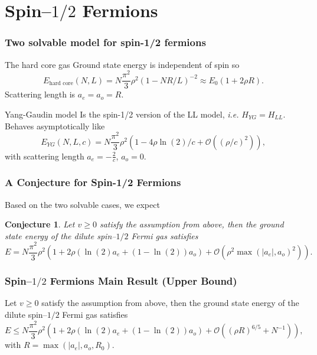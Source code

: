 \documentclass{beamer}[10]
\newcommand{\abs}[1]{\left\lvert #1 \right\rvert}
\newcommand{\ie}{\emph{i.e.} }
\newtheorem{mconjecture}{Conjecture}
\begin{document}
\section{Spin--$1/2$ Fermions}
\begin{frame}
	\frametitle{Two solvable model for spin-1/2 fermions}
	\vspace*{-0.4cm}
	\begin{block}{The hard core gas}
		Ground state energy is independent of spin
		so \begin{equation}
		E_{\text{hard core}}(N,L)=N\frac{\pi^2}{3}\rho^2 (1-NR/L)^{-2}\approx E_0(1+2\rho R).
		\end{equation}
		Scattering length is $ a_e=a_o=R $.
	\end{block}
	\begin{block}{Yang-Gaudin model}
		Is the spin-1/2 version of the LL model, \ie $ H_{YG}=H_{LL} $.
		 Behaves asymptotically like
		 \begin{equation}
		 E_{YG}(N,L,c)=N\frac{\pi^2}{3}\rho^2\left(1-4\rho\ln(2)/c+\mathcal{O}\left((\rho/c)^2\right)\right),
		 \end{equation}
		 with scattering length $ a_e=-\frac{2}{c} $, $ a_o=0 $.
		\end{block}
\end{frame}

\begin{frame}
	\frametitle{A Conjecture for Spin-1/2 Fermions}
	\small
	Based on the two solvable cases, we expect
	\begin{mconjecture}\label{ConjectureEqCSpin1/2FermiGroundStateEnergy}
		Let $ v\geq0 $ satisfy the assumption from above, then the ground state energy of the dilute spin--$ 1/2 $ Fermi gas satisfies\begin{equation}\label{EqConjectureEqCSpin1/2FermiGroundStateEnergy}
			E=N\frac{\pi^2}{3}\rho^2\left(1+2\rho \left(\ln(2) a_e+(1-\ln(2))a_o\right)+\mathcal{O}(\rho^2\max(\abs{a_e},a_o)^2)\right).
		\end{equation}
	\end{mconjecture}
\end{frame}

\begin{frame}
	\frametitle{Spin--$1/2$ Fermions Main Result (Upper Bound)}
	\begin{block}{}
		\small
		\begin{theorem}\label{TheoremUpperBoundSpin1/2Fermi}
			Let $ v\geq0 $ satisfy the assumption from above, then the ground state energy of the dilute spin--$ 1/2 $ Fermi gas satisfies\begin{equation}\label{EqUpperBoundSpin1/2Fermi}
				E\leq N\frac{\pi^2}{3}\rho^2\left(1+2\rho \left(\ln(2) a_e+(1-\ln(2))a_o\right)+\mathcal{O}\left((\rho R)^{6/5}+N^{-1}\right)\right),
			\end{equation}
			with $ R=\max(\abs{a_e}, a_o, R_0) $.
		\end{theorem}
	\end{block}	
\end{frame}
\end{document}
